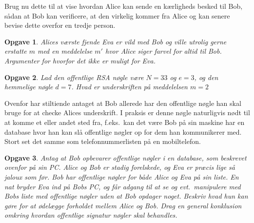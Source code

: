 \documentclass{article}
\theoremstyle{opgavedd}
\newtheorem{opgave}{Opgave}[section]
\begin{document}
Brug nu dette til at vise hvordan Alice kan sende en kærligheds besked til Bob, sådan at
Bob kan verificere, at den virkelig kommer fra Alice og kan senere bevise dette overfor en
tredje person.

\begin{opgave}
  Alices værste fjende Eva er vild med Bob og ville utrolig gerne erstatte $m$ med en
  meddelelse $m'$ hvor Alice siger farvel for altid til Bob. Argumenter for hvorfor det
  ikke er muligt for Eva.
\end{opgave}

\begin{opgave}
  Lad den offentlige RSA nøgle være $N=33$ og $e=3$, og den hemmelige nøgle $d=7$. Hvad
  er underskriften på meddelelsen $m=2$
\end{opgave}

Ovenfor har stiltiende antaget at Bob allerede har den offentlige nøgle han skal bruge for
at checke Alices underskrift. I praksis er denne nøgle naturligvis nødt til at komme et
eller andet sted fra, f.eks.~kan det være Bob på sin maskine har en database hvor han
kan slå offentlige nøgler op for dem han kommunikerer med. Stort set det samme som
telefonnummerlisten på en mobiltelefon.

\begin{opgave}
  Antag at Bob opbevarer offentlige nøgler i en database, som beskrevet ovenfor på sin
  PC. Alice og Bob er stadig forelskede, og Eva er præcis lige så jaloux som før. Bob har
  offentlige nøgler for både Alice og Eva på sin liste. En nat bryder Eva ind på Bobs PC,
  og får adgang til at se og evt.~manipulere med Bobs liste med offentlige nøgler uden at
  Bob opdager noget. Beskriv hvad hun kan gøre for at ødelægge forholdet mellem Alice og
  Bob. Drag en general konklusion omkring hvordan offentlige signatur nøgler skal
  behandles.
\end{opgave}


\end{document}
